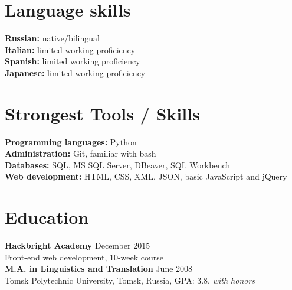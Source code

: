 \documentclass[10pt,line,letterpaper]{res}
\begin{document}
\begin{resume}
\begin{itemize}
    \end{itemize}

\section {Language skills}
    {\bf Russian:} native/bilingual \\
    {\bf Italian:} limited working proficiency \\
    {\bf Spanish:} limited working proficiency \\
    {\bf Japanese:} limited working proficiency \\

\section{Strongest Tools / Skills}
    {\bf Programming languages:} Python \\
    {\bf Administration:} Git, familiar with bash \\
    {\bf Databases:}  SQL, MS SQL Server, DBeaver, SQL Workbench\\
    {\bf Web development:} HTML, CSS, XML, JSON, basic JavaScript and jQuery \\

\section{Education}
    {\bf Hackbright Academy} \hfill December 2015 \\ Front-end web development, 10-week course \\
    {\bf M.A. in Linguistics and Translation} \hfill June 2008 \\Tomsk Polytechnic University, Tomsk, Russia, GPA: 3.8, \textit{with honors}

\end{resume}
\end{document}
